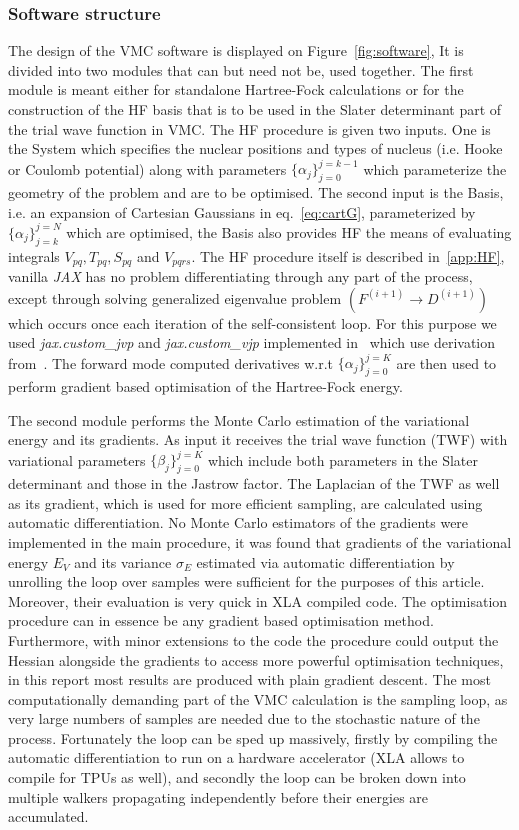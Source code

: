 \documentclass[final,3p,times,twocolumn]{elsarticle}
\begin{document}
	\subsubsection{Software structure}
	The design of the VMC software is displayed on Figure~\ref{fig:software}, It is divided into two modules that can but need not be, used together. The first module is meant either for standalone Hartree-Fock calculations or for the construction of the HF basis that is to be used in the Slater determinant part of the trial wave function in VMC. The HF procedure is given two inputs. One is the System which specifies the nuclear positions and types of nucleus (i.e. Hooke or Coulomb potential) along with parameters $\{\alpha_{j}\}_{j=0}^{j=k-1}$ which parameterize the geometry of the problem and are to be optimised. The second input is the Basis, i.e. an expansion of Cartesian Gaussians in eq.~\eqref{eq:cartG}, parameterized by $\{\alpha_{j}\}_{j=k}^{j=N}$ which are optimised, the Basis also provides HF the means of evaluating integrals $V_{p q}, T_{p q}, S_{p q}$ and $V_{pqrs}$. The HF procedure itself is described in~\ref{app:HF}, vanilla \emph{JAX} has no problem differentiating through any part of the process, except through solving  generalized eigenvalue problem $(F^{(i+1)} \rightarrow D^{(i+1)})$ which occurs once each iteration of the self-consistent loop. For this purpose we used \emph{jax.custom\_jvp} and \emph{jax.custom\_vjp} implemented in~\cite{dj2021gep} which use derivation from~\cite{boeddeker2017computation}. The forward mode computed derivatives w.r.t $\{\alpha_{j}\}_{j=0}^{j=K}$ are then used to perform gradient based optimisation of the Hartree-Fock energy.
		
	The second module performs the Monte Carlo estimation of the variational energy and its gradients. As input it receives the trial wave function (TWF) with variational parameters $\{\beta_{j}\}_{j=0}^{j=K}$ which include both parameters in the Slater determinant and those in the Jastrow factor. The Laplacian of the TWF as well as its gradient, which is used for more efficient sampling, are calculated using automatic differentiation. No Monte Carlo estimators of the gradients were implemented in the main procedure, it was found that gradients of the variational energy $E_V$ and its variance $\sigma_{E}$ estimated via automatic differentiation by unrolling the loop over samples were sufficient for the purposes of this article. Moreover, their evaluation is very quick in XLA compiled code. The optimisation procedure can in essence be any gradient based optimisation method. Furthermore, with minor extensions to the code the procedure could output the Hessian alongside the gradients to access more powerful optimisation techniques, in this report most results are produced with plain gradient descent. The most computationally demanding part of the VMC calculation is the sampling loop, as very large numbers of samples are needed due to the stochastic nature of the process. Fortunately the loop can be sped up massively, firstly by compiling the automatic differentiation to run on a hardware accelerator (XLA allows to compile for TPUs as well), and secondly the loop can be broken down into multiple walkers propagating independently before their energies are accumulated.
	
\end{document}
